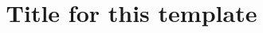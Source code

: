 \documentclass[nonacm,sigplan]{acmart}
\begin{document}
%
\title{Title for this template}




% 
\end{document}
